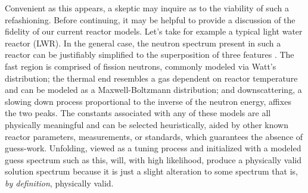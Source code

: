 Convenient as this appears, a skeptic may inquire as to the viability of such a refashioning.
Before continuing, it may be helpful to provide a discussion of the fidelity of our current reactor models.
Let's take for example a typical light water reactor (LWR).
In the general case, the neutron spectrum present in such a reactor can be justifiably simplified to the superposition of three features \cite{lewis2008fundamentals}.
The fast region is comprised of fission neutrons, commonly modeled via Watt's distribution; the thermal end resembles a gas dependent on reactor temperature and can be modeled as a Maxwell-Boltzmann distribution; and downscattering, a slowing down process proportional to the inverse of the neutron energy, affixes the two peaks.
The constants associated with any of these models are all physically meaningful and can be selected heuristically, aided by other known reactor parameters, measurements, or standards, which guarantees the absence of guess-work.
Unfolding, viewed as a tuning process and initialized with a modeled guess spectrum such as this, will, with high likelihood, produce a physically valid solution spectrum because it is just a slight alteration to some spectrum that is, {\it by definition}, physically valid.

